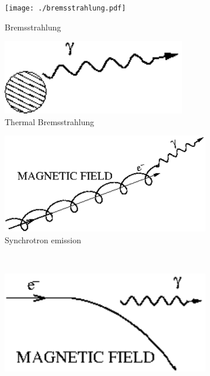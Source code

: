 \documentclass[main.tex]{subfiles}
\begin{document}
\begin{figure}
\begin{subfigure}{0.31\textwidth}
\texttt{[image: ./bremsstrahlung.pdf]}
\caption{Bremsstrahlung} \label{fig:1a}
\end{subfigure}
\hspace*{\fill} %
\begin{subfigure}{0.31\textwidth}
\includegraphics[width=\linewidth]{Pictures/thermalbrehms.pdf}
\caption{Thermal Bremsstrahlung} \label{fig:1b}
\end{subfigure}
\hspace*{\fill} %
\begin{subfigure}{0.31\textwidth}
\includegraphics[width=\linewidth]{Pictures/synchrotron.pdf}
\caption{Synchrotron emission} \label{fig:1c} 
\end{subfigure} \\
\begin{subfigure}{0.31\textwidth}
\includegraphics[width=\linewidth]{Pictures/curvaturerad.pdf}

\end{subfigure}
\end{figure}
\end{document}
